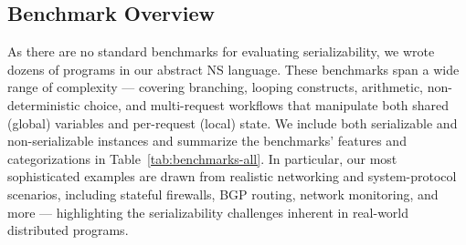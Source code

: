 \subsection{Benchmark Overview} 
\label{subsec:benchmarks}

As there are no standard benchmarks for evaluating serializability, we wrote dozens of programs in our abstract NS language. These benchmarks span a wide range of complexity --- covering branching, looping constructs, arithmetic, non-deterministic choice, and multi-request workflows that manipulate both shared (global) variables and per-request (local) state. 
%
We include both serializable and non-serializable instances and summarize the benchmarks' features and categorizations in Table~\ref{tab:benchmarks-all}. 
%
In particular, our most sophisticated examples are drawn from realistic networking and system-protocol scenarios, including stateful firewalls, BGP routing, network monitoring, and more --- highlighting the serializability challenges inherent in real-world distributed programs.

%
%		
%
%
%
%



